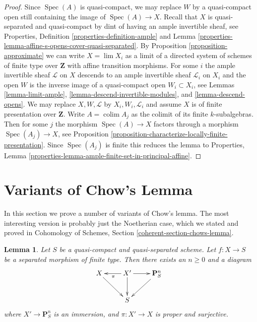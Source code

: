 \documentclass{stacks-project}
\theoremstyle{plain}
\newtheorem{lemma}[subsection]{Lemma}
\theoremstyle{definition}
\theoremstyle{remark}
\numberwithin{equation}{subsection}
\def\lim{\mathop{\mathrm{lim}}\nolimits}
\def\colim{\mathop{\mathrm{colim}}\nolimits}
\def\Spec{\mathop{\mathrm{Spec}}}
\begin{document}
\begin{proof}
Since $\Spec(A)$ is quasi-compact, we may replace $W$ by a quasi-compact
open still containing the image of $\Spec(A) \to X$.
Recall that $X$ is quasi-separated and quasi-compact by dint
of having an ample invertible sheaf, see
Properties, Definition \ref{properties-definition-ample} and
Lemma \ref{properties-lemma-affine-s-opens-cover-quasi-separated}.
By Proposition \ref{proposition-approximate} we can
write $X = \lim X_i$ as a limit of a directed system
of schemes of finite type over $\mathbf{Z}$
with affine transition morphisms.
For some $i$ the ample invertible sheaf $\mathcal{L}$ on $X$
descends to an ample invertible sheaf $\mathcal{L}_i$ on $X_i$
and the open $W$ is the inverse image of a quasi-compact
open $W_i \subset X_i$, see
Lemmas \ref{lemma-limit-ample}, \ref{lemma-descend-invertible-modules}, and
\ref{lemma-descend-opens}.
We may replace $X, W, \mathcal{L}$ by $X_i, W_i, \mathcal{L}_i$
and assume $X$ is of finite presentation over $\mathbf{Z}$.
Write $A = \colim A_j$ as the colimit of its finite $k$-subalgebras.
Then for some $j$ the morphism $\Spec(A) \to X$ factors through
a morphism $\Spec(A_j) \to X$, see
Proposition \ref{proposition-characterize-locally-finite-presentation}.
Since $\Spec(A_j)$ is finite this reduces the lemma to
Properties, Lemma \ref{properties-lemma-ample-finite-set-in-principal-affine}.
\end{proof}



















\section{Variants of Chow's Lemma}
\label{section-chows-lemma}

\noindent
In this section we prove a number of variants of Chow's lemma.
The most interesting version is probably just the Noetherian
case, which we stated and proved in
Cohomology of Schemes, Section \ref{coherent-section-chows-lemma}.

\begin{lemma}
\label{lemma-chow-finite-type}
Let $S$ be a quasi-compact and quasi-separated scheme.
Let $f : X \to S$ be a separated morphism of finite type.
Then there exists an $n \geq 0$ and a diagram
$$
\xymatrix{
X \ar[rd] & X' \ar[d] \ar[l]^\pi \ar[r] & \mathbf{P}^n_S \ar[dl] \\
& S &
}
$$
where $X' \to \mathbf{P}^n_S$ is an immersion, and
$\pi : X' \to X$ is proper and surjective.
\end{lemma}
\end{document}
